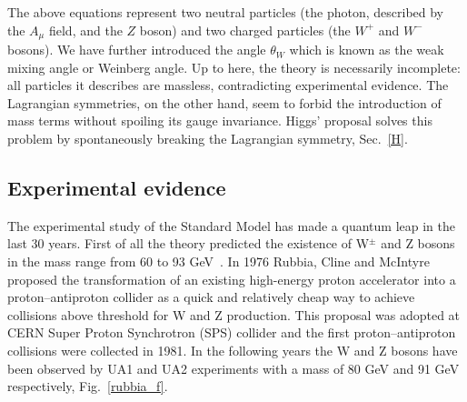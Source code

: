 The above equations represent two neutral particles (the photon, described by the $A_{\mu}$
field, and the $Z$ boson) and two charged particles (the $W^+$ and $W^-$ bosons). We have
further introduced the angle $\theta_W$  which is known as the weak mixing angle or Weinberg
angle. Up to here, the theory is necessarily incomplete: all particles it describes are
massless, contradicting experimental evidence. The Lagrangian symmetries, on the other
hand, seem to forbid the introduction of mass terms without spoiling its gauge invariance.
Higgs’ proposal solves this problem by spontaneously breaking the Lagrangian symmetry, Sec.~\ref{H}.

\subsection*{Experimental evidence}
The experimental study  of the Standard Model  has made a quantum leap in the last 30 years. First of all the theory predicted the existence of W$^{\pm}$ and Z bosons in the mass range from 60 to 93 GeV~\cite{doi:10.1142/9789814644150_0006}. 
In 1976 Rubbia, Cline and McIntyre proposed the transformation of an existing high-energy proton accelerator into a proton–antiproton collider as a quick and relatively cheap way to achieve collisions above threshold for W and Z production.  This proposal  was adopted at CERN Super Proton Synchrotron (SPS) collider  and the first  proton–antiproton  collisions were collected in 1981. In the following years the W and Z bosons have been observed by UA1 and UA2 experiments with a mass of 80 GeV and 91 GeV respectively, Fig.~\ref{rubbia_f}. 
